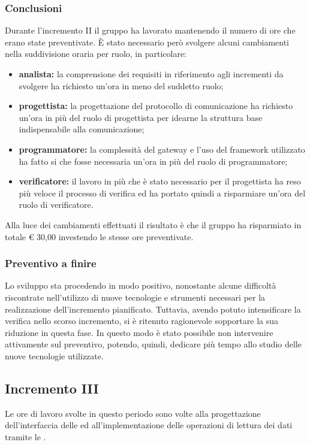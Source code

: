 			\subsubsection{Conclusioni}
			Durante l'incremento II il gruppo ha lavorato mantenendo il numero di ore che erano state preventivate. È stato necessario però svolgere alcuni cambiamenti nella suddivisione oraria per ruolo, in particolare:
			\begin{itemize}
				\item \textbf{analista:} la comprensione dei requisiti in riferimento agli incrementi da svolgere ha richiesto un'ora in meno del suddetto ruolo;
				\item \textbf{progettista:} la progettazione del protocollo di comunicazione ha richiesto un'ora in più del ruolo di progettista per idearne la struttura base indispensabile alla comunicazione;
				\item \textbf{programmatore:} la complessità del gateway e l'uso del framework utilizzato ha fatto si che fosse necessaria un'ora in più del ruolo di programmatore;
				\item \textbf{verificatore:} il lavoro in più che è stato necessario per il progettista ha reso più veloce il processo di verifica ed ha portato quindi a risparmiare un'ora del ruolo di verificatore.
			\end{itemize}
			Alla luce dei cambiamenti effettuati il risultato è che il gruppo ha risparmiato in totale € 30,00 investendo le stesse ore preventivate.
			\pagebreak
		
		\subsubsection{Preventivo a finire}
			Lo sviluppo sta procedendo in modo positivo, nonostante alcune difficoltà riscontrate nell'utilizzo di nuove tecnologie e strumenti necessari per la realizzazione dell'incremento pianificato.
			\newline
			Tuttavia, avendo potuto intensificare la verifica nello scorso incremento, si è ritenuto ragionevole sopportare la sua riduzione in questa fase. In questo modo è stato possibile non intervenire attivamente sul preventivo, potendo, quindi, dedicare più tempo allo studio delle nuove tecnologie utilizzate.

		
		\subsection{Incremento III }
		Le ore di lavoro svolte in questo periodo sono volte alla progettazione dell'interfaccia delle  ed all'implementazione delle operazioni di lettura dei dati tramite le .
